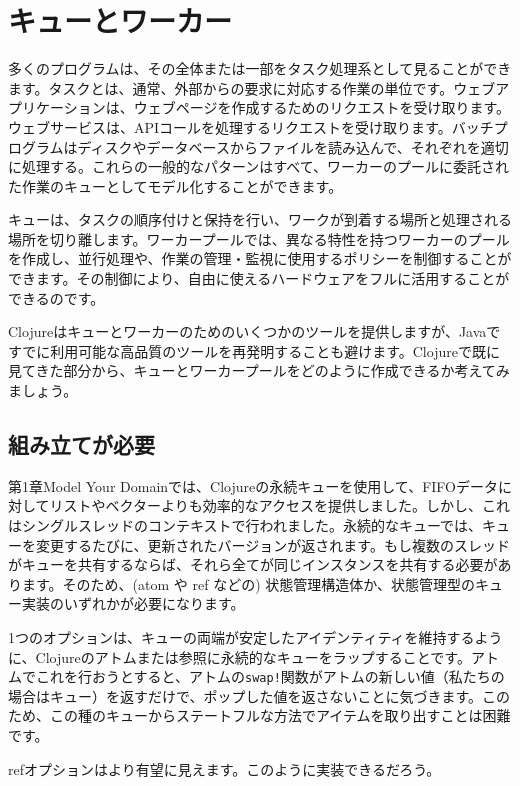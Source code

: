 \section{キューとワーカー}

多くのプログラムは、その全体または一部をタスク処理系として見ることができます。タスクとは、通常、外部からの要求に対応する作業の単位です。ウェブアプリケーションは、ウェブページを作成するためのリクエストを受け取ります。ウェブサービスは、APIコールを処理するリクエストを受け取ります。バッチプログラムはディスクやデータベースからファイルを読み込んで、それぞれを適切に処理する。これらの一般的なパターンはすべて、ワーカーのプールに委託された作業のキューとしてモデル化することができます。

キューは、タスクの順序付けと保持を行い、ワークが到着する場所と処理される場所を切り離します。ワーカープールでは、異なる特性を持つワーカーのプールを作成し、並行処理や、作業の管理・監視に使用するポリシーを制御することができます。その制御により、自由に使えるハードウェアをフルに活用することができるのです。

Clojureはキューとワーカーのためのいくつかのツールを提供しますが、Javaですでに利用可能な高品質のツールを再発明することも避けます。Clojureで既に見てきた部分から、キューとワーカープールをどのように作成できるか考えてみましょう。

\subsection{組み立てが必要}

第1章Model Your Domainでは、Clojureの永続キューを使用して、FIFOデータに対してリストやベクターよりも効率的なアクセスを提供しました。しかし、これはシングルスレッドのコンテキストで行われました。永続的なキューでは、キューを変更するたびに、更新されたバージョンが返されます。もし複数のスレッドがキューを共有するならば、それら全てが同じインスタンスを共有する必要があります。そのため、(atom や ref などの) 状態管理構造体か、状態管理型のキュー実装のいずれかが必要になります。

1つのオプションは、キューの両端が安定したアイデンティティを維持するように、Clojureのアトムまたは参照に永続的なキューをラップすることです。アトムでこれを行おうとすると、アトムの\texttt{swap!}関数がアトムの新しい値（私たちの場合はキュー）を返すだけで、ポップした値を返さないことに気づきます。このため、この種のキューからステートフルな方法でアイテムを取り出すことは困難です。

refオプションはより有望に見えます。このように実装できるだろう。


